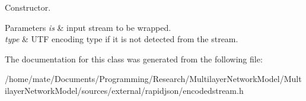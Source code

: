 Constructor. 


\begin{DoxyParams}{Parameters}
{\em is} & input stream to be wrapped. \\
\hline
{\em type} & U\+TF encoding type if it is not detected from the stream. \\
\hline
\end{DoxyParams}


The documentation for this class was generated from the following file\+:\begin{DoxyCompactItemize}
\item 
/home/mate/\+Documents/\+Programming/\+Research/\+Multilayer\+Network\+Model/\+Multilayer\+Network\+Model/sources/external/rapidjson/encodedstream.\+h\end{DoxyCompactItemize}
